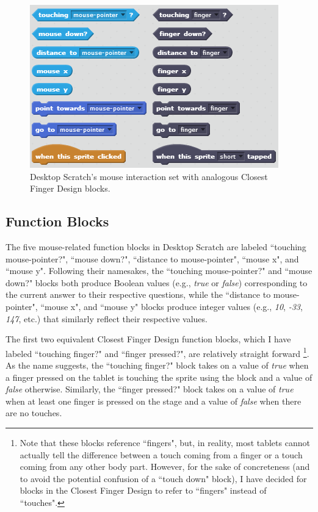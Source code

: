 \begin{figure}
\centering
\includegraphics{images/Closest_Finger_Design_Block_Set.PNG}
\caption{Desktop Scratch's mouse interaction set with analogous Closest Finger Design blocks.}
\end{figure}

\subsection{Function Blocks}
The five mouse-related function blocks in Desktop Scratch are labeled ``touching mouse-pointer?", ``mouse down?", ``distance to mouse-pointer", ``mouse x", and ``mouse y". Following their namesakes, the ``touching mouse-pointer?" and ``mouse down?" blocks both produce Boolean values (e.g., \emph{true} or \emph{false}) corresponding to the current answer to their respective questions, while the ``distance to mouse-pointer", ``mouse x", and ``mouse y" blocks produce integer values (e.g., \emph{10}, \emph{-33}, \emph{147}, etc.) that similarly reflect their respective values. 

The first two equivalent Closest Finger Design function blocks, which I have labeled ``touching finger?" and ``finger pressed?", are relatively straight forward
\footnote{Note that these blocks reference ``fingers", but, in reality, most tablets cannot actually tell the difference between a touch coming from a finger or a touch coming from any other body part. However, for the sake of concreteness (and to avoid the potential confusion of a ``touch down" block), I have decided for blocks in the Closest Finger Design to refer to ``fingers" instead of ``touches".}.
As the name suggests, the ``touching finger?" block takes on a value of \emph{true} when a finger pressed on the tablet is touching the sprite using the block and a value of \emph{false} otherwise. Similarly, the ``finger pressed?" block takes on a value of \emph{true} when at least one finger is pressed on the stage and a value of \emph{false} when there are no touches.


